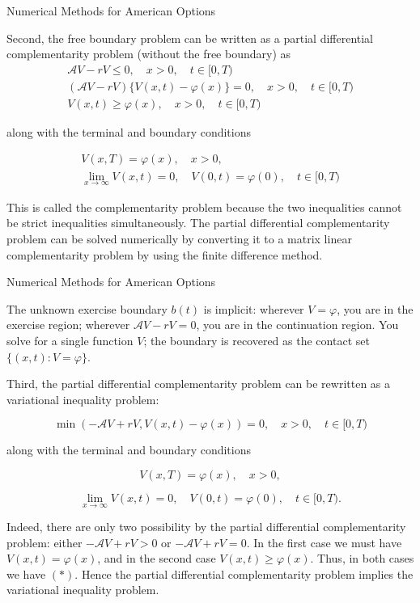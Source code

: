 \documentclass{beamer}
\begin{document}
\begin{frame}{Numerical Methods for American Options}

    {\footnotesize \footnotesize
    Second, the free boundary problem can be written as a partial differential complementarity problem (without the free boundary) as
    \begin{gather*}
        \mathcal{A} V - rV  \leq  0, \quad x > 0, \quad t \in [0,T) \\
    (\mathcal{A} V - rV) \{ V(x,t) - \varphi(x) \}  =  0, \quad x > 0, \quad t \in [0,T) \\
    V(x,t)  \geq \varphi(x), \quad x > 0, \quad t \in [0,T)
    \end{gather*}
    
    along with the terminal and boundary conditions

    \begin{gather*}
        V(x,T)  =  \varphi(x), \quad x > 0, \\
    \lim_{x \to \infty} V(x,t)  =  0, \quad V(0,t) = \varphi(0), \quad t \in [0,T)
    \end{gather*}

     \pause This is called the complementarity problem because the two inequalities cannot be strict 
    inequalities simultaneously. The partial differential complementarity problem can be solved 
    numerically by converting it to a matrix linear 
    complementarity problem by using the finite difference method.
        }
\end{frame}

\begin{frame}{Numerical Methods for American Options}

    {\footnotesize \footnotesize
    The unknown exercise boundary \( b(t) \) is implicit: wherever \( V = \varphi \), you are in the exercise region;  
    wherever \( \mathcal{A} V - rV = 0 \), you are in the continuation region. You solve for a single function \( V \); the  
    boundary is recovered as the contact set \(\{(x, t) : V = \varphi\}\).
    \vspace{1em}

      \pause Third, the partial differential complementarity problem can be rewritten as a variational inequality problem:

    \[
    \min(-\mathcal{A} V + rV, V(x,t) - \varphi(x)) = 0, \quad x > 0, \quad t \in [0,T) \tag{*}
    \]

    along with the terminal and boundary conditions

    \[
    V(x,T) = \varphi(x), \quad x > 0,
    \]

    \[
    \lim_{x \to \infty} V(x,t) = 0, \quad V(0,t) = \varphi(0), \quad t \in [0,T).
    \]

    \pause  Indeed, there are only two possibility by the partial differential complementarity 
    problem: either \(-\mathcal{A} V + rV > 0\) or \(-\mathcal{A} V + rV = 0\). In the first case we must 
    have \(V(x,t) = \varphi(x)\), and in the second case \(V(x,t) \geq \varphi(x)\). Thus, 
    in both cases we have $(*)$. Hence the partial differential complementarity problem 
    implies the variational inequality problem. 
        }
\end{frame}
\end{document}
